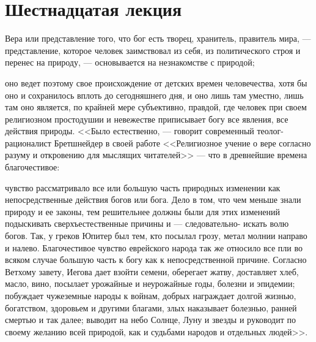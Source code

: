 \documentclass[12pt]{article}
\begin{document}
\section*{Шестнадцатая лекция}

Вера или представление того, что бог есть творец, хранитель, правитель мира, --- представление, которое человек заимствовал из себя, из политического строя и перенес на природу, --- основывается на незнакомстве с природой; 

оно ведет поэтому свое происхождение от детских времен человечества, хотя бы оно и сохранилось вплоть до сегодняшнего дня, и оно лишь там уместно, лишь там оно является, по крайней мере субъективно, правдой, где человек при своем религиозном простодушии и невежестве приписывает богу все явления, все действия природы. <<Было естественно, --- говорит современный теолог-рационалист Бретшнейдер в своей работе <<Религиозное учение о вере согласно разуму и откровению для мыслящих читателей>> --- что в древнейшие времена благочестивое: 

чувство рассматривало все или большую часть природных изменении как непосредственные действия богов или бога. Дело в том, что чем меньше знали природу и ее законы, тем решительнее должны были для этих изменений подыскивать сверхъестественные причины и --- следовательно- искать волю богов. Так, у греков Юпитер был тем, кто посылал грозу, метал молнии направо и налево. Благочестивое чувство еврейского народа так же относило все пли во всяком случае большую часть к богу как к непосредственной причине. Согласно Ветхому завету, Иегова дает взойти семени, оберегает жатву, доставляет хлеб, масло, вино, посылает урожайные и неурожайные годы, болезни и эпидемии; побуждает чужеземные народы к войнам, добрых награждает долгой жизнью, богатством, здоровьем и другими благами, злых наказывает болезнью, ранней смертью и так далее; выводит на небо Солнце, Луну и звезды и руководит по своему желанию всей природой, как и судьбами народов и отдельных людей>>. 
\end{document}
